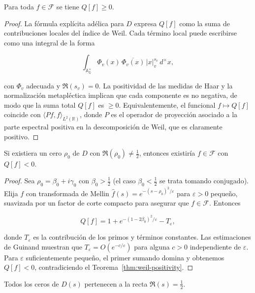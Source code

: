 \begin{theorem}\label{thm:weil-positivity}
Para toda $f\in\mathcal{F}$ se tiene $Q[f]\geqslant 0$.
\end{theorem}

\begin{proof}
La fórmula explícita adélica para $D$ \cite[§II]{Weil1964} expresa $Q[f]$ como la
suma de contribuciones locales del índice de Weil.  Cada término local puede
escribirse como una integral de la forma

\[
  \int_{\mathbb{A}_\mathbb{Q}^{\times}} \Phi_v(x)\,\overline{\Phi_v(x)}\,|x|_v^{s_v}\,d^{\times}x,
\]

con $\Phi_v$ adecuada y $\Re(s_v)=0$.  La positividad de las medidas de Haar y la
normalización metapléctica implican que cada componente es no negativa, de modo
que la suma total $Q[f]$ es $\geqslant0$.  Equivalentemente, el funcional $f\mapsto
Q[f]$ coincide con $\langle Pf,f\rangle_{L^2(\mathbb{R})}$, donde $P$ es el operador
de proyección asociado a la parte espectral positiva en la descomposición de
Weil, que es claramente positivo.
\end{proof}

\begin{lemma}\label{lem:no-off-axis}
Si existiera un cero $\rho_0$ de $D$ con $\Re(\rho_0)\neq\tfrac{1}{2}$, entonces
existiría $f\in\mathcal{F}$ con $Q[f]<0$.
\end{lemma}

\begin{proof}
Sea $\rho_0=\beta_0+i\gamma_0$ con $\beta_0>\tfrac{1}{2}$ (el caso $\beta_0<\tfrac{1}{2}$
se trata tomando conjugado).  Elija $f$ con transformada de Mellin
$\widehat{f}(s)=e^{-(s-\rho_0)^2/\varepsilon}$ para $\varepsilon>0$ pequeño, suavizada
por un factor de corte compacto para asegurar que $f\in\mathcal{F}$.  Entonces

\[
  Q[f]=1+e^{-(1-2\beta_0)^2/\varepsilon}-T_\varepsilon,
\]

donde $T_\varepsilon$ es la contribución de los primos y términos constantes.
Las estimaciones de Guinand
\cite[Eq.~(8)]{Guinand1955} muestran que $T_\varepsilon=O(e^{-c/\varepsilon})$
para alguna $c>0$ independiente de $\varepsilon$.  Para $\varepsilon$ suficientemente
pequeño, el primer sumando domina y obtenemos $Q[f]<0$, contradiciendo el
Teorema~\ref{thm:weil-positivity}.
\end{proof}

\begin{corollary}
Todos los ceros de $D(s)$ pertenecen a la recta $\Re(s)=\tfrac{1}{2}$.
\end{corollary}

